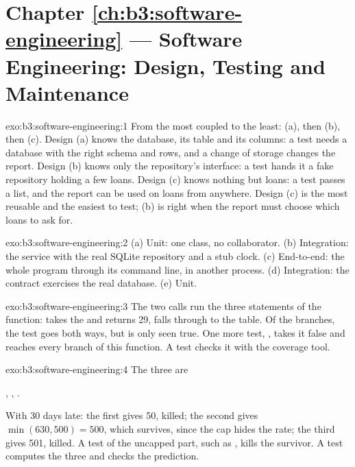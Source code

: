 \section*{Chapter \ref{ch:b3:software-engineering} --- Software Engineering: Design, Testing and Maintenance}

\begin{solution}{exo:b3:software-engineering:1}
From the most coupled to the least: (a), then (b), then (c). Design (a) knows the database, its table and its columns: a test needs a database with the right schema and rows, and a change of storage changes the report. Design (b) knows only the repository's interface: a test hands it a fake repository holding a few loans. Design (c) knows nothing but loans: a test passes a list, and the report can be used on loans from anywhere. Design (c) is the most reusable and the easiest to test; (b) is right when the report must choose which loans to ask for.
\end{solution}

\begin{solution}{exo:b3:software-engineering:2}
(a) Unit: one class, no collaborator. (b) Integration: the service with the real SQLite repository and a stub clock. (c) End-to-end: the whole program through its command line, in another process. (d) Integration: the contract exercises the real database. (e) Unit.
\end{solution}

\begin{solution}{exo:b3:software-engineering:3}
The two calls run the three statements of the function:  takes the  and returns 29,  falls through to the table. Of the branches, the test  goes both ways, but  is only seen true. One more test, , takes it false and reaches every branch of this function. A test checks it with the coverage tool.
\end{solution}

\begin{solution}{exo:b3:software-engineering:4}
The three  are
\begin{center}, \quad {}, \quad {}.\end{center}
 With 30 days late: the first gives 50, killed; the second gives $\min(630, 500) = 500$, which survives, since the cap hides the rate; the third gives 501, killed. A test of the uncapped part, such as , kills the survivor. A test computes the three  and checks the prediction.
\end{solution}

